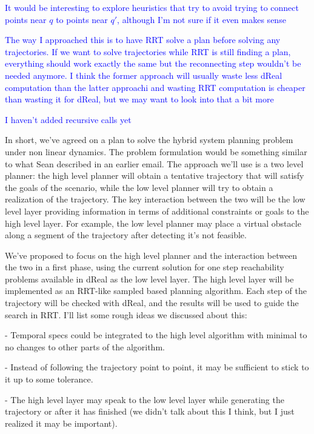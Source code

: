 \documentclass[12pt]{article}
\newcommand\fran[1]{\textcolor{blue}{#1}}
\begin{document}
\fran{It would be interesting to explore heuristics that try to avoid trying to connect points near $q$ to points near $q'$, although I'm not sure if it even makes sense}

\fran{The way I approached this is to have RRT solve a plan before solving any trajectories. If we want to solve trajectories while RRT is still finding a plan, everything should work exactly the same but the reconnecting step wouldn't be needed anymore. I think the former approach will usually waste less dReal computation than the latter approachi and wasting RRT computation is cheaper than wasting it for dReal, but we may want to look into that a bit more}

\fran{I haven't added recursive calls yet}

\iffalse
In short, we've agreed on a plan to solve the hybrid system planning problem under non linear dynamics. The problem formulation would be something similar to what Sean described in an earlier email. The approach we'll use is a two level planner: the high level planner will obtain a tentative trajectory that will satisfy the goals of the scenario, while the low level planner will try to obtain a realization of the trajectory. The key interaction between the two will be the low level layer providing information in terms of additional constraints or goals to the high level layer. For example, the low level planner may place a virtual obstacle along a segment of the trajectory after detecting it's not feasible.

We've proposed to focus on the high level planner and the interaction between the two in a first phase, using the current solution for one step reachability problems available in dReal as the low level layer. The high level layer will be implemented as an RRT-like sampled based planning algorithm. Each step of the trajectory will be checked with dReal, and the results will be used to guide the search in RRT. I'll list some rough ideas we discussed about this:

- Temporal specs could be integrated to the high level algorithm with minimal to no changes to other parts of the algorithm.

- Instead of following the trajectory point to point, it may be sufficient to stick to it up to some tolerance.

- The high level layer may speak to the low level layer while generating the trajectory or after it has finished (we didn't talk about this I think, but I just realized it may be important).
\end{document}

